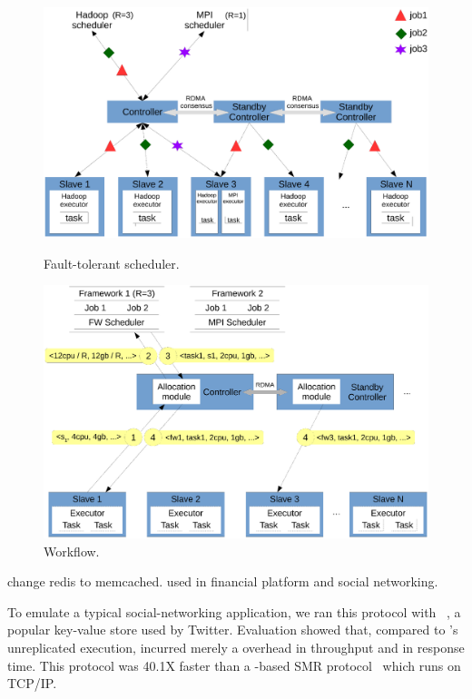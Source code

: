 \begin{figure}[!htb]
    \begin{minipage}{.49\textwidth}
        \includegraphics[width=0.34\textheight]{figures/scheduler_arch.ps}
        \vspace{0.1in}
        \caption{Fault-tolerant scheduler.}
        \label{fig:scheduler-arch}
    \end{minipage}
    \begin{minipage}{0.51\textwidth}
        \includegraphics[width=0.34\textheight]{figures/scheduler_flow.ps}
        \vspace{0.1in}
        \caption{Workflow.}
        \label{fig:scheduler-workflow}
    \end{minipage}
\end{figure}

 change redis to memcached. used in financial 
platform and social networking.

To emulate a typical social-networking application, we ran this protocol with 
\redis~\cite{redis}, a popular key-value store used by Twitter. Evaluation 
showed that, compared to \redis's unreplicated execution, \xxx incurred merely 
a \tputoverhead overhead in throughput and \latencyoverhead in response time. 
This protocol was 40.1X faster than a \zookeeper-based
SMR protocol~\cite{calvin:sigmod12} which runs on TCP/IP.

